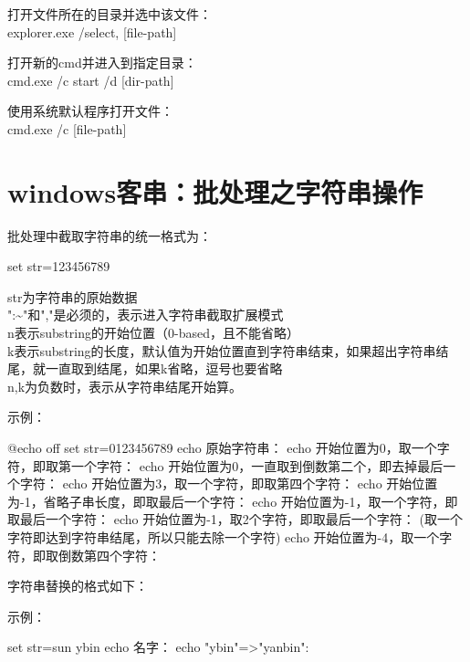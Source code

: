 ﻿\documentclass[a4paper,11pt]{article}
\begin{document}
  打开文件所在的目录并选中该文件：\\
  explorer.exe /select, [file-path]

  打开新的cmd并进入到指定目录：\\
  cmd.exe /c start /d [dir-path]

  使用系统默认程序打开文件：\\
  cmd.exe /c [file-path]

  \section[Windows客串：批处理-字符串操作]{windows客串：批处理之字符串操作}
  批处理中截取字符串的统一格式为：
  
  \begin{bashcode}
    set str=123456789
  \end{bashcode}

  str为字符串的原始数据\\
  ":\~{}"和","是必须的，表示进入字符串截取扩展模式\\
  n表示substring的开始位置（0-based，且不能省略）\\
  k表示substring的长度，默认值为开始位置直到字符串结束，如果超出字符串结尾，就一直取到结尾，如果k省略，逗号也要省略\\
  n,k为负数时，表示从字符串结尾开始算。
  

  示例：\par
  \begin{bashcode}
    @echo off
    set str=0123456789
    echo 原始字符串：%
    echo 开始位置为0，取一个字符，即取第一个字符：%
    echo 开始位置为0，一直取到倒数第二个，即去掉最后一个字符：%
    echo 开始位置为3，取一个字符，即取第四个字符：%
    echo 开始位置为-1，省略子串长度，即取最后一个字符：%
    echo 开始位置为-1，取一个字符，即取最后一个字符：%
    echo 开始位置为-1，取2个字符，即取最后一个字符：%
    (取一个字符即达到字符串结尾，所以只能去除一个字符)
    echo 开始位置为-4，取一个字符，即取倒数第四个字符：%
  \end{bashcode}


  字符串替换的格式如下：

  \begin{bashcode}
  \end{bashcode}

  示例：
  
  \begin{bashcode}
    set str=sun ybin
    echo 名字：%
    echo "ybin"=>"yanbin": %
  \end{bashcode}
\end{document}

